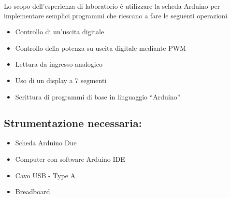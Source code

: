 Lo scopo dell'esperienza di laboratorio è utilizzare la scheda Arduino per implementare semplici programmi che riescano a fare le seguenti operazioni
\begin{itemize}
    \item Controllo di un’uscita digitale
    \item Controllo della potenza su uscita digitale mediante PWM
    \item Lettura da ingresso analogico
    \item Uso di un display a 7 segmenti
    \item Scrittura di programmi di base in linguaggio “Arduino”
\end{itemize}
\subsection*{Strumentazione necessaria:}
\begin{itemize}
    \item Scheda Arduino Due
    \item Computer con software Arduino IDE
    \item Cavo USB - Type A
    \item Breadboard
\end{itemize}